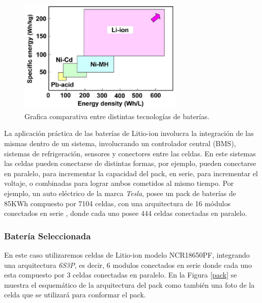 \documentclass[10pt,a4paper]{article}
\begin{document}
    \begin{figure}[h!]
        \begin{center}
            \includegraphics[width=0.7\textwidth]{comparisson-liion.png}
            \caption{Grafica comparativa entre distintas
            tecnologías de baterías.}
            \label{comparisson_batt}
        \end{center}
    \end{figure}

	\noindent La aplicación práctica de las baterías de Litio-ion involucra la 
    integración de las mismas dentro de un sistema, involucrando un controlador 
    central (\acrshort{BMS}), sistemas de refrigeración, sensores y conectores entre las 
    celdas. En este sistemas las celdas pueden conectarse de distintas 
    formas, por ejemplo, pueden conectarse en paralelo, para incrementar la 
    capacidad del pack, en serie, para incrementar el voltaje, o combinadas 
    para lograr ambos cometidos al mismo tiempo. Por ejemplo, un auto eléctrico 
    de la marca \emph{Tesla}, posee un pack de baterías de 85KWh compuesto por 
    7104 celdas, con una arquitectura de 16 módulos conectados en serie
    , donde cada uno posee 444 celdas conectadas en paralelo.

    \subsubsection{Batería Seleccionada}\label{batSel}

	\noindent En este caso utilizaremos celdas de Litio-ion modelo NCR18650PF, 
    integrando una arquitectura \emph{6S3P}, es decir, 6 modulos conectados en 
    serie donde cada uno esta compuesto por 3 celdas conectadas en paralelo. 
    En la Figura \ref{pack} se muestra el esquemático de la arquitectura del 
    pack como también una foto de la celda que se utilizará para conformar el 
    pack. 
	
\end{document}
